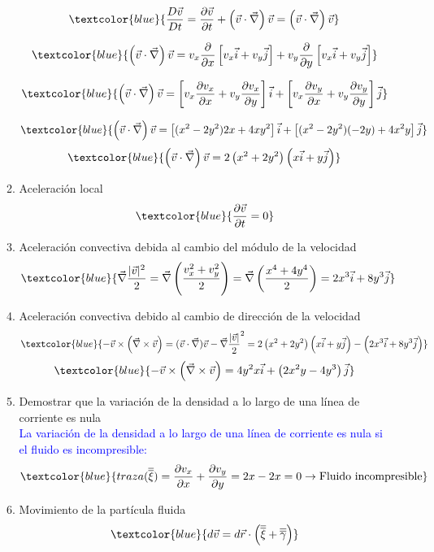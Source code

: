 \begin{enumerate}
\begin{enumerate}
		\[	\textcolor{blue}{\frac{D\vec{v}}{Dt}=\frac{\partial\vec{v}}{\partial t}+\left(\vec{v}\cdot\vec{\nabla}\right)\vec{v}=\left(\vec{v}\cdot\vec{\nabla}\right)\vec{v}}\]
		
		\[\textcolor{blue}{\left(\vec{v}\cdot\vec{\nabla}\right)\vec{v}=v_x\frac{\partial}{\partial x}\left[v_x\vec{i}+v_y\vec{j}\right]+v_y\frac{\partial}{\partial y}\left[v_x\vec{i}+v_y\vec{j}\right]}\]
		
		\[\textcolor{blue}{\left(\vec{v}\cdot\vec{\nabla}\right)\vec{v}=\left[v_x\frac{\partial v_x}{\partial x} +v_y\frac{\partial v_x}{\partial y}\right]\vec{i}+\left[v_x\frac{\partial v_y}{\partial x} +v_y\frac{\partial v_y}{\partial y}\right]\vec{j}}\]
		
		\[\textcolor{blue}{\left(\vec{v}\cdot\vec{\nabla}\right)\vec{v}=\left[(x^2-2y^2)2x+4xy^2\right]\vec{i}+\left[(x^2-2y^2)(-2y)+4x^2y\right]\vec{j}}\]
		\[\textcolor{blue}{\left(\vec{v}\cdot\vec{\nabla}\right)\vec{v}=2\left(x^2+2y^2\right)\left(x\vec{i}+y\vec{j}\right)}\]
		\item Aceleración local
		\[\textcolor{blue}{\frac{\partial \vec{v}}{\partial t}=0}\]
		\item Aceleración convectiva debida al cambio del módulo de la velocidad
		\[\textcolor{blue}{\vec{\nabla}\frac{|\vec{v}|^2}{2}=\vec{\nabla}\left(\frac{v_x^2+v_y^2}{2}\right)=\vec{\nabla}\left(\frac{x^4+4y^4}{2}\right)=2x^3\vec{i}+8y^3\vec{j}}\]
		\item Aceleración convectiva debido al cambio de dirección de la velocidad
			\[\textcolor{blue}{-\vec{v} \times \left(\vec{\nabla}\times\vec{v}\right)=(\vec{v} \cdot\vec{\nabla})\vec{v}-\vec{\nabla}\frac{|\vec{v}|}{2}^2=2\left(x^2+2y^2\right)\left(x\vec{i}+y\vec{j}\right)-\left(2x^3\vec{i}+8y^3\vec{j}\right)}\]
			\[\textcolor{blue}{-\vec{v} \times \left(\vec{\nabla}\times\vec{v}\right)=4y^2x\vec{i}+\left(2x^2y-4y^3\right)\vec{j}}\]
		\item Demostrar que la variación de la densidad a lo largo de una línea de corriente es nula\\
		\textcolor{blue}{La variación de la densidad a lo largo de una línea de corriente es nula si el fluido es incompresible:}
		\[\textcolor{blue}{traza(\overline{\overline{\xi}})=\frac{\partial v_x}{\partial x}+\frac{\partial v_y}{\partial y}=2x-2x=0 \rightarrow \text{Fluido incompresible}}\]
		\item  Movimiento de la partícula fluida
		\[\textcolor{blue}{d\vec{v}=d\vec{r}\cdot\left(\overline{\overline{\xi}}+\overline{\overline{\gamma}}\right)}\]
		

\end{enumerate}
\end{enumerate}
